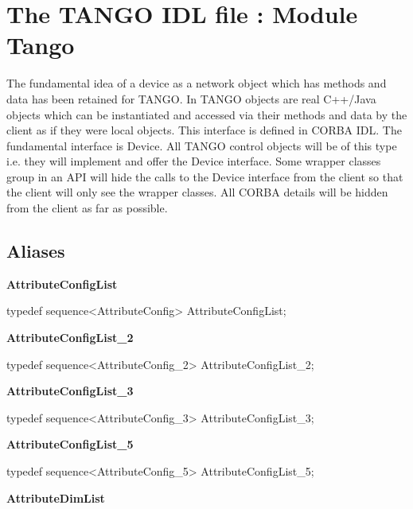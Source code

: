 
\chapter{The TANGO IDL file : Module Tango}

The fundamental idea of a device as a network object which has methods
and data has been retained for TANGO. In TANGO objects are real C++/Java
objects which can be instantiated and accessed via their methods and
data by the client as if they were local objects. This interface is
defined in CORBA IDL. The fundamental interface is Device. All TANGO
control objects will be of this type i.e. they will implement and
offer the Device interface. Some wrapper classes group in an API will
hide the calls to the Device interface from the client so that the
client will only see the wrapper classes. All CORBA details will be
hidden from the client as far as possible.


\section{Aliases}

\textbf{AttributeConfigList}

typedef sequence<AttributeConfig> AttributeConfigList;\\


\begin{flushleft}
\textbf{AttributeConfigList\_2}
\par\end{flushleft}

typedef sequence<AttributeConfig\_2> AttributeConfigList\_2;\\


\begin{flushleft}
\textbf{AttributeConfigList\_3}
\par\end{flushleft}

typedef sequence<AttributeConfig\_3> AttributeConfigList\_3;\\


\begin{flushleft}
\textbf{AttributeConfigList\_5}
\par\end{flushleft}

typedef sequence<AttributeConfig\_5> AttributeConfigList\_5;\\


\begin{flushleft}
\textbf{AttributeDimList}
\par\end{flushleft}

